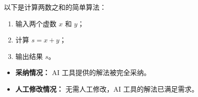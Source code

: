 
\begin{GeminiBlock}
以下是计算两数之和的简单算法：
\begin{enumerate}
    \item 输入两个虚数 $x$ 和 $y$；
    \item 计算 $s = x + y$；
    \item 输出结果 $s$。
\end{enumerate}
\end{GeminiBlock}

\begin{block}[colback=green!10, colframe=green!50, title={\textcolor{black}{采纳和人工修改情况}}]
\begin{itemize}
    \item \textbf{采纳情况：} AI 工具提供的解法被完全采纳。
    \item \textbf{人工修改情况：} 无需人工修改，AI 工具的解法已满足需求。
\end{itemize}
\end{block}
